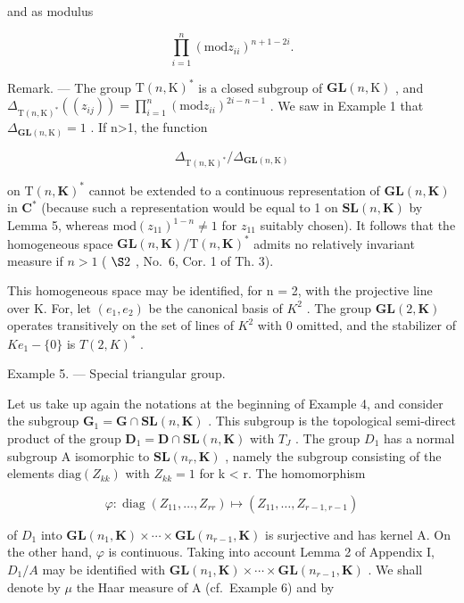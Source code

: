 and as modulus

\[
\prod_ {i = 1} ^ {n} (\mathrm{mod} z _ {i i}) ^ {n + 1 - 2 i}.
\]

Remark. --- The group \(\mathrm{T}(n,\mathrm{K})^{*}\) is a closed subgroup of \(\mathbf{GL}(n,\mathrm{K})\) , and \(\Delta_{\mathrm{T}(n,\mathrm{K})^{*}}\left((z_{ij})\right)=\prod_{i=1}^{n}(\mathrm{mod}z_{ii})^{2i-n-1}\) . We saw in Example 1 that \(\Delta_{\mathbf{GL}(n,\mathrm{K})}=1\) . If n\textgreater1, the function

\[
\Delta_ {\mathrm{T} (n, \mathrm{K}) ^ {*}} / \Delta_ {\mathbf {G L} (n, \mathrm{K})}
\]

on \(\mathrm{T}(n,\mathbf{K})^*\) cannot be extended to a continuous representation of \(\mathbf{GL}(n,\mathbf{K})\) in \(\mathbf{C}^*\) (because such a representation would be equal to 1 on \(\mathbf{SL}(n,\mathbf{K})\) by Lemma 5, whereas \(\mathrm{mod}(z_{11})^{1 - n}\neq 1\) for \(z_{11}\) suitably chosen). It follows that the homogeneous space \(\mathbf{GL}(n,\mathbf{K}) / \mathrm{T}(n,\mathbf{K})^*\) admits no relatively invariant measure if \(n > 1\) ( \(\S 2\) , No.~6, Cor. 1 of Th. 3).

This homogeneous space may be identified, for n = 2, with the projective line over K. For, let \((e_{1}, e_{2})\) be the canonical basis of \(K^{2}\) . The group \(\mathbf{GL}(2, \mathbf{K})\) operates transitively on the set of lines of \(K^{2}\) with 0 omitted, and the stabilizer of \(Ke_{1} - \{0\}\) is \(T(2, K)^{*}\) .

Example 5. --- Special triangular group.

Let us take up again the notations at the beginning of Example 4, and consider the subgroup \(\mathbf{G}_{1} = \mathbf{G} \cap \mathbf{SL}(n, \mathbf{K})\) . This subgroup is the topological semi-direct product of the group \(\mathbf{D}_{1} = \mathbf{D} \cap \mathbf{SL}(n, \mathbf{K})\) with \(T_{J}\) . The group \(D_{1}\) has a normal subgroup A isomorphic to \(\mathbf{SL}(n_{r}, \mathbf{K})\) , namely the subgroup consisting of the elements \(\text{diag}(Z_{kk})\) with \(Z_{kk} = 1\) for k \textless{} r. The homomorphism

\[
\varphi : \operatorname{diag} (Z _ {1 1}, \dots , Z _ {r r}) \mapsto (Z _ {1 1}, \dots , Z _ {r - 1, r - 1})
\]

of \(D_{1}\) into \(\mathbf{GL}(n_{1},\mathbf{K})\times\cdots\times\mathbf{GL}(n_{r-1},\mathbf{K})\) is surjective and has kernel A. On the other hand, \(\varphi\) is continuous. Taking into account Lemma 2 of Appendix I, \(D_{1}/A\) may be identified with \(\mathbf{GL}(n_{1},\mathbf{K})\times\cdots\times\mathbf{GL}(n_{r-1},\mathbf{K})\) . We shall denote by \(\mu\) the Haar measure of A (cf.~Example 6) and by

